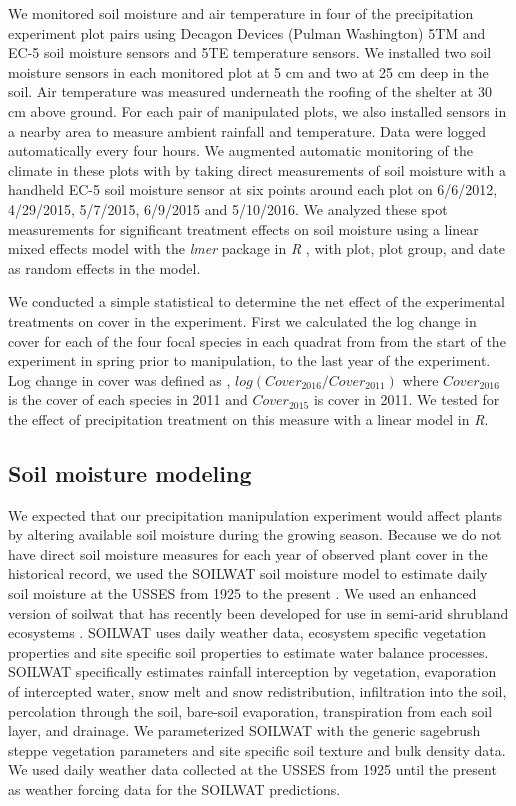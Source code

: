\documentclass[11pt]{article}
\begin{document}
\begin{doublespacing}
We monitored soil moisture and air temperature in four of the precipitation experiment plot pairs using Decagon Devices (Pulman Washington) 5TM and EC-5 soil moisture sensors and 5TE temperature sensors.  We installed two soil moisture sensors in each monitored plot at 5 cm and two at 25 cm deep in the soil.  Air temperature was measured underneath the roofing of the shelter at 30 cm above ground. For each pair of manipulated plots, we also installed sensors in a nearby area to measure ambient rainfall and temperature. Data were logged automatically every four hours. We augmented automatic monitoring of the climate in these plots with by taking direct measurements of soil moisture with a handheld EC-5 soil moisture sensor at six points around each plot on 6/6/2012, 4/29/2015, 5/7/2015, 6/9/2015 and 5/10/2016. We analyzed these spot measurements for significant treatment effects on soil moisture using a linear mixed effects model with the \textit{lmer} package in \textit{R} \citep{bates}, with plot, plot group, and date as random effects in the model.    

We conducted a simple statistical to determine the net effect of the experimental treatments on cover in the experiment. First we calculated the log change in cover for each of the four focal species in each quadrat from from the start of the experiment in spring prior to manipulation, to the last year of the experiment. Log change in cover was defined as , $log(Cover_{2016}/Cover_{2011})$ where $Cover_{2016}$ is the cover of each species in 2011 and $Cover_{2015}$ is cover in 2011. We tested for the effect of precipitation treatment on this measure with a linear model in \textit{R}.

\subsection*{Soil moisture modeling}

We expected that our precipitation manipulation experiment would affect plants by altering available soil moisture during the growing season.  Because we do not have direct soil moisture measures for each year of observed plant cover in the historical record, we used the SOILWAT soil moisture model to estimate daily soil moisture at the USSES from 1925 to the present \citep{Parton 1978}. We used an enhanced version of soilwat that has recently been developed for use in semi-arid shrubland ecosystems \citep{Bradford}. SOILWAT uses daily weather data, ecosystem specific vegetation properties and site specific soil properties to estimate water balance processes. SOILWAT specifically estimates rainfall interception by vegetation, evaporation of intercepted water, snow melt and snow redistribution, infiltration into the soil, percolation through the soil, bare-soil evaporation, transpiration from each soil layer, and drainage. We parameterized SOILWAT with the generic sagebrush steppe vegetation parameters and site specific soil texture and bulk density data. We used daily weather data collected at the USSES from 1925 until the present as weather forcing data for the SOILWAT predictions.  


\end{doublespacing}
\end{document}
